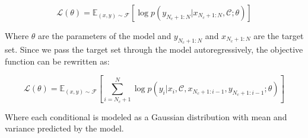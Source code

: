 \documentclass[main.tex]{subfiles}
\begin{document}
\begin{equation}
	\mathcal{L}(\theta) = \mathbb{E}_{(x, y) \sim \mathcal{F}} \left[ \log p(y_{N_c+1:N} | x_{N_c+1:N}, \mathcal{C}; \theta) \right]
	\end{equation}

Where $\theta$ are the parameters of the model and $y_{N_c+1:N}$ and $x_{N_c+1:N}$ are the target set. Since we pass the target set through the model autoregressively, the objective function can be rewritten as:

\begin{equation}
	\mathcal{L}(\theta) = \mathbb{E}_{(x, y) \sim \mathcal{F}} \left[ \sum_{i=N_c+1}^{N} \log p(y_i | x_i, \mathcal{C}, x_{N_c+1:i-1}, y_{N_c+1:i-1}; \theta) \right]
\end{equation}

Where each conditional is modeled as a Gaussian distribution with mean and variance predicted by the model. 

\ifSubfilesClassLoaded{%
    \printbibliography{}
}{} 
\end{document}
